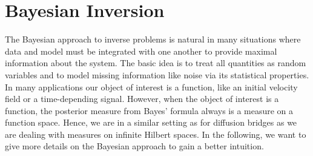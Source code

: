 \section{Bayesian Inversion}

The Bayesian approach to inverse problems is natural in many situations where data and model must be integrated with one another to provide maximal information about the system. The basic idea is to treat all quantities as random variables and to model missing information like noise via its statistical properties. In many applications our object of interest is a function, like an initial velocity field or a time-depending signal. However, when the object of interest is a function, the posterior measure from Bayes' formula always is a measure on a function space. Hence, we are in a similar setting as for diffusion bridges as we are dealing with measures on infinite Hilbert spaces.  In the following, we want to give more details on the Bayesian approach to gain a better intuition.


